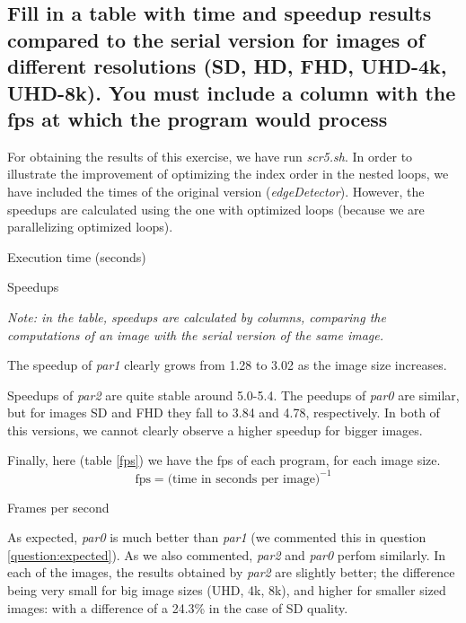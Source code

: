 \documentclass{article}
\newcommand{\question}[1]{\subsection{#1}}
\begin{document}
\question{Fill in a table with time and speedup results compared to the serial version for images of different resolutions (SD, HD, FHD, UHD-4k, UHD-8k). You must include a column with the fps at which the program would process}\label{question:5.4}

For obtaining the results of this exercise, we have run \emph{scr5.sh}. In order to illustrate the improvement of optimizing the index order in the nested loops, we have included the times of the original version (\emph{edgeDetector}). However, the speedups are calculated using the one with optimized loops (because we are parallelizing optimized loops).

\begin{table}[h]
    
    \centering
    \caption{Execution time (seconds)}
\end{table}

\pagebreak

\begin{table}[h]
    
    \centering
    \caption{Speedups}
    \emph{Note: in the table, speedups are calculated by columns, comparing the computations of an image with the serial version of the same image.}
    \raggedright
\end{table}

The speedup of \emph{par1} clearly grows from 1.28 to 3.02 as the image size increases.

Speedups of \emph{par2} are quite stable around 5.0-5.4. The peedups of \emph{par0} are similar, but for images SD and FHD they fall to 3.84 and 4.78, respectively. In both of this versions, we cannot clearly observe a higher speedup for bigger images.

Finally, here (table \ref{fps}) we have the fps of each program, for each image size. 
\[
    \text{fps} = \text{(time in seconds per image)} ^{-1}
\]

\begin{table}[h]
    
    \centering
    \caption{Frames per second}
    \label{fps}
\end{table}

As expected, \emph{par0} is much better than \emph{par1} (we commented this in question \ref{question:expected}). As we also commented, \emph{par2} and \emph{par0} perfom similarly. In each of the images, the results obtained by \emph{par2} are slightly better; the difference being very small for big image sizes (UHD, 4k, 8k), and higher for smaller sized images: with a difference of a 24.3\% in the case of SD quality.
\end{document}
